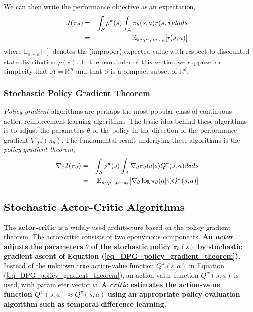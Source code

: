 We can then write the performance objective as an expectation,
\begin{eqnarray}\label{eq_DPG_performance_objective}
J(\pi_\theta) &=& \int_\mathcal{S}\rho^\pi(s)\int_\mathcal{A}\pi_\theta
(s,a) r(s,a) dads \notag \\
&=& \mathbb{E}_{s\sim\rho^\pi, a\sim\pi_\theta}[r(s,a)]
\end{eqnarray}
where $\mathbb{E}_{s\sim\rho}[\cdot]$ denotes the (improper) expected 
value with respect to discounted state distribution $\rho(s)$. In the 
remainder of this section we suppose for simplicity that $\mathcal{A} 
= \mathbb{R}^m$ and that $\mathcal{S}$ is a compact subset of $\mathbb{R}^d$.

\subsubsection{Stochastic Policy Gradient Theorem}

\emph{Policy gradient} algorithms are perhaps the most popular class of 
continuous action reinforcement learning algorithms. The basic idea behind 
these algorithms is to adjust the parameters $\theta$ of the policy in the 
direction of the performance gradient $\nabla_\theta J(\pi_\theta)$. The 
fundamental result underlying these algorithms is the \emph{policy 
gradient theorem},
\begin{eqnarray}\label{eq_DPG_policy_gradient_theorem}
\nabla_\theta J(\pi_\theta)
&=& \int_\mathcal{S}\rho^\pi(s)\int_\mathcal{A}\nabla_\theta\pi_\theta
(a|s)Q^\pi(s,a) da ds \notag \\
&=& \mathbb{E}_{s\sim\rho^\pi, a\sim\pi_\theta}
[\nabla_\theta\log\pi_\theta(a|s)Q^\pi(s,a)]
\end{eqnarray}


\subsection{Stochastic Actor-Critic Algorithms}

The {\bf actor-critic} is a widely used architecture based on the
policy gradient theorem. The actor-critic consists of two eponymous 
components. {\bf An \emph{actor} adjusts the parameters $\theta$ of the 
stochastic policy $\pi_\theta(s)$ by stochastic gradient ascent of 
Equation (\ref{eq_DPG_policy_gradient_theorem}).} Instead of the
unknown true action-value function $Q^\pi(s,a)$ in Equation 
(\ref{eq_DPG_policy_gradient_theorem}), an action-value function 
$Q^w(s, a)$ is used, with parameter vector $w$. {\bf A \emph{critic} 
estimates the action-value function $Q^w(s,a)\approx Q^\pi(s,a)$ 
using an appropriate policy evaluation algorithm such as 
temporal-difference learning.}

